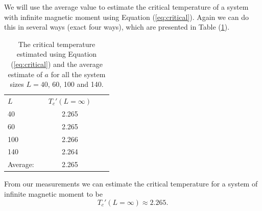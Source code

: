 \documentclass[norsk,a4paper,12pt]{article}
\begin{document}
We will use the average value to estimate the critical temperature of a system with infinite magnetic moment using Equation (\ref{eq:critical}). Again we can do this in several ways (exact four ways), which are presented in Table (\ref{tab:tcs}).
\begin{table}[H]
\centering
\caption{The critical temperature estimated using Equation (\ref{eq:critical}) and the average estimate of $a$ for all the system sizes $L=40$, 60, 100 and 140.}
\label{tab:tcs} 
\begin{tabularx}{\textwidth}{XlcrX}
&&\\
\toprule
$L$ && $T_c'(L=\infty)$\\
\midrule
40    && 2.265\\
60    && 2.265\\
100   && 2.266\\
140   && 2.264\\
\midrule
Average:&& 2.265\\
\bottomrule
\end{tabularx}
\end{table}
From our measurements we can estimate the critical temperature for a system of infinite magnetic moment to be 
\begin{equation}
T_c'(L=\infty)\approx2.265.
\end{equation}
\end{document}
